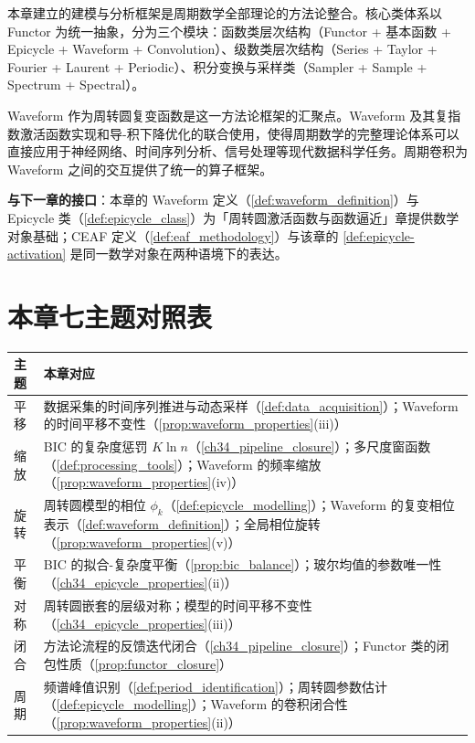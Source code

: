 \begin{remark}[与全书的统一]\label{rem:methodology_unity}
本章建立的建模与分析框架是周期数学全部理论的方法论整合。核心类体系以 Functor 为统一抽象，分为三个模块：函数类层次结构（Functor + 基本函数 + Epicycle + Waveform + Convolution）、级数类层次结构（Series + Taylor + Fourier + Laurent + Periodic）、积分变换与采样类（Sampler + Sample + Spectrum + Spectral）。

Waveform 作为周转圆复变函数是这一方法论框架的汇聚点。Waveform 及其复指数激活函数实现和导-积下降优化的联合使用，使得周期数学的完整理论体系可以直接应用于神经网络、时间序列分析、信号处理等现代数据科学任务。周期卷积为 Waveform 之间的交互提供了统一的算子框架。

\textbf{与下一章的接口}：本章的 Waveform 定义（\cref{def:waveform_definition}）与 Epicycle 类（\cref{def:epicycle_class}）为「周转圆激活函数与函数逼近」章提供数学对象基础；CEAF 定义（\cref{def:eaf_methodology}）与该章的 \cref{def:epicycle-activation} 是同一数学对象在两种语境下的表达。
\end{remark}

\section*{本章七主题对照表}

\begin{center}
\renewcommand{\arraystretch}{1.3}
\begin{tabular}{@{}p{2.2cm} p{10.5cm}@{}}
\toprule
主题 & 本章对应 \\
\midrule
平移 & 数据采集的时间序列推进与动态采样（\cref{def:data_acquisition}）；Waveform 的时间平移不变性（\cref{prop:waveform_properties}(iii)） \\
缩放 & BIC 的复杂度惩罚 $K\ln n$（\cref{ch34_pipeline_closure}）；多尺度窗函数（\cref{def:processing_tools}）；Waveform 的频率缩放（\cref{prop:waveform_properties}(iv)） \\
旋转 & 周转圆模型的相位 $\phi_k$（\cref{def:epicycle_modelling}）；Waveform 的复变相位表示（\cref{def:waveform_definition}）；全局相位旋转（\cref{prop:waveform_properties}(v)） \\
平衡 & BIC 的拟合-复杂度平衡（\cref{prop:bic_balance}）；玻尔均值的参数唯一性（\cref{ch34_epicycle_properties}(ii)） \\
对称 & 周转圆嵌套的层级对称；模型的时间平移不变性（\cref{ch34_epicycle_properties}(iii)） \\
闭合 & 方法论流程的反馈迭代闭合（\cref{ch34_pipeline_closure}）；Functor 类的闭包性质（\cref{prop:functor_closure}） \\
周期 & 频谱峰值识别（\cref{def:period_identification}）；周转圆参数估计（\cref{def:epicycle_modelling}）；Waveform 的卷积闭合性（\cref{prop:waveform_properties}(ii)） \\
\bottomrule
\end{tabular}
\end{center}


